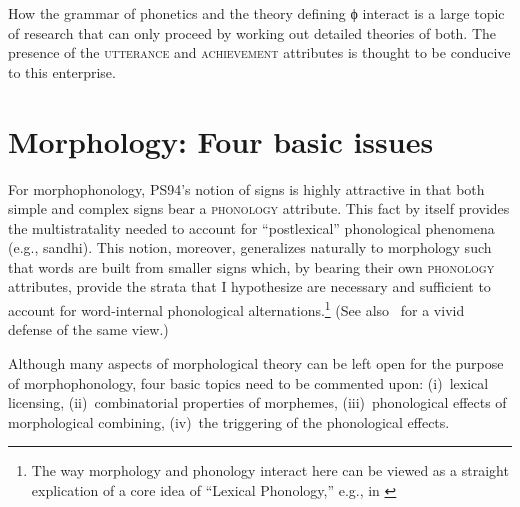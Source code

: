 \documentclass[output=paper]{langsci/langscibook}
\begin{document}
How the grammar of phonetics and the theory defining ϕ interact is a
large topic of research that can only proceed by working out detailed
theories of both.  The presence of the \textsc{utterance} and \textsc{achievement} attributes is thought to be conducive to this enterprise.






\section{Morphology: Four basic issues}

For morphophonology, {\small PS94}'s notion of signs is highly attractive
in that both simple and complex signs bear a \textsc{phonology} attribute.
This fact by itself provides the multistratality needed to account for
``postlexical'' phonological phenomena (e.g., sandhi). This notion,
moreover, generalizes naturally to morphology such that words are built
from smaller signs which, by bearing their own \textsc{phonology} attributes,
provide the strata that I hypothesize are necessary and sufficient to
account for word-internal phonological alternations.\footnote{%
The way morphology and
  phonology interact here can be viewed as a straight explication of a core
  idea of ``Lexical Phonology,'' e.g.,
  in \cite[142\hspace{1pt}f.\@]{moha:86}%
}
(See also~\cite{orgu:96} for a vivid defense of the
same view.)%


Although many aspects of morphological theory can be left open for the
purpose of morphophonology, four basic topics need to be commented upon:
(i)~lexical licensing, (ii)~combinatorial properties of morphemes, (iii)~phonological effects of morphological combining, (iv)~the triggering of the
phonological effects.
\end{document}
